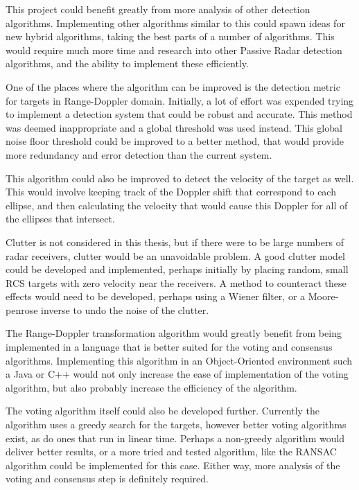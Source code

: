 \documentclass[12pt,openany,a4paper]{book}
\begin{document}
\bigskip

This project could benefit greatly from more analysis of other detection algorithms. Implementing other algorithms similar to this could spawn ideas for new hybrid algorithms, taking the best parts of a number of algorithms. This would require much more time and research into other Passive Radar detection algorithms, and the ability to implement these efficiently.

\bigskip

One of the places where the algorithm can be improved is the detection metric for targets in Range-Doppler domain. Initially, a lot of effort was expended trying to implement a detection system that could be robust and accurate. This method was deemed inappropriate and a global threshold was used instead. This global noise floor threshold could be improved to a better method, that would provide more redundancy and error detection than the current system. 

\bigskip

This algorithm could also be improved to detect the velocity of the target as well. This would involve keeping track of the Doppler shift that correspond to each ellipse, and then calculating the velocity that would cause this Doppler for all of the ellipses that intersect.

\bigskip

Clutter is not considered in this thesis, but if there were to be large numbers of radar receivers, clutter would be an unavoidable problem. A good clutter model could be developed and implemented, perhaps initially by placing random, small RCS targets with zero velocity near the receivers. A method to counteract these effects would need to be developed, perhaps using a Wiener filter, or a Moore-penrose inverse to undo the noise of the clutter.

\bigskip

The Range-Doppler transformation algorithm would greatly benefit from being implemented in a language that is better suited for the voting and consensus algorithms. Implementing this algorithm in an Object-Oriented environment such a Java or C++ would not only increase the ease of implementation of the voting algorithm, but also probably increase the efficiency of the algorithm.

\bigskip

The voting algorithm itself could also be developed further. Currently the algorithm uses a greedy search for the targets, however better voting algorithms exist, as do ones that run in linear time. Perhaps a non-greedy algorithm would deliver better results, or a more tried and tested algorithm, like the RANSAC algorithm could be implemented for this case. Either way, more analysis of the voting and consensus step is definitely required.
\end{document}
